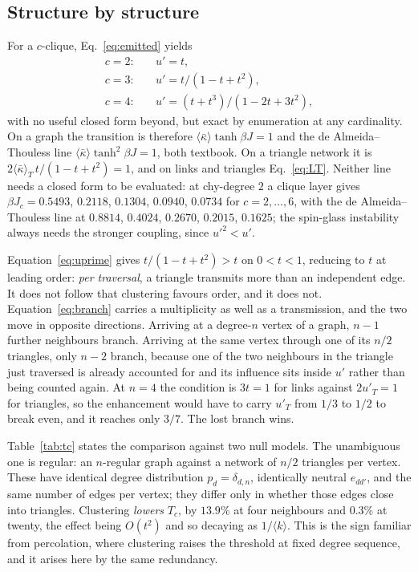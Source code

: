 \documentclass[aps,pre,twocolumn,superscriptaddress,floatfix]{revtex4-2}
\newcommand{\ave}[1]{\langle #1 \rangle}
\newcommand{\kbar}{\bar\kappa}
\begin{document}
\subsection{Structure by structure}

For a $c$-clique, Eq.~\eqref{eq:emitted} yields
\begin{align}
  c=2:&\quad u'=t, \nonumber\\
  c=3:&\quad u'=t/(1-t+t^{2}), \nonumber\\
  c=4:&\quad u'=(t+t^{3})/(1-2t+3t^{2}),
  \label{eq:uprime}
\end{align}
with no useful closed form beyond, but exact by enumeration at any cardinality.
On a graph the transition is therefore $\ave{\kbar}\tanh\beta J=1$ and the de
Almeida--Thouless line $\ave{\kbar}\tanh^2\beta J=1$, both textbook. On a
triangle network it is $2\ave{\kbar}_T\,t/(1-t+t^2)=1$, and on links and
triangles Eq.~\eqref{eq:LT}. Neither line needs a closed form to be evaluated:
at chy-degree $2$ a clique layer gives $\beta J_c=0.5493$, $0.2118$, $0.1304$,
$0.0940$, $0.0734$ for $c=2,\dots,6$, with the de Almeida--Thouless line at
$0.8814$, $0.4024$, $0.2670$, $0.2015$, $0.1625$; the spin-glass instability
always needs the stronger coupling, since $u'^{2}<u'$.

Equation~\eqref{eq:uprime} gives $t/(1-t+t^2)>t$ on $0<t<1$, reducing to $t$ at
leading order: \emph{per traversal}, a triangle transmits more than an
independent edge. It does not follow that clustering favours order, and it does
not. Equation~\eqref{eq:branch} carries a multiplicity as well as a
transmission, and the two move in opposite directions. Arriving at a
degree-$n$ vertex of a graph, $n-1$ further neighbours branch. Arriving at the
same vertex through one of its $n/2$ triangles, only $n-2$ branch, because one
of the two neighbours in the triangle just traversed is already accounted for
and its influence sits inside $u'$ rather than being counted again. At $n=4$
the condition is $3t=1$ for links against $2u'_T=1$ for triangles, so the
enhancement would have to carry $u'_T$ from $1/3$ to $1/2$ to break even, and
it reaches only $3/7$. The lost branch wins.

Table~\ref{tab:tc} states the comparison against two null models. The
unambiguous one is regular: an $n$-regular graph against a network of $n/2$
triangles per vertex. These have identical degree distribution
$p_d=\delta_{d,n}$, identically neutral $e_{dd'}$, and the same number of edges
per vertex; they differ only in whether those edges close into triangles.
Clustering \emph{lowers} $T_c$, by $13.9\%$ at four neighbours and $0.3\%$ at
twenty, the effect being $O(t^2)$ and so decaying as $1/\ave{k}$. This is the
sign familiar from percolation, where clustering raises the threshold at fixed
degree sequence, and it arises here by the same redundancy.
\end{document}
